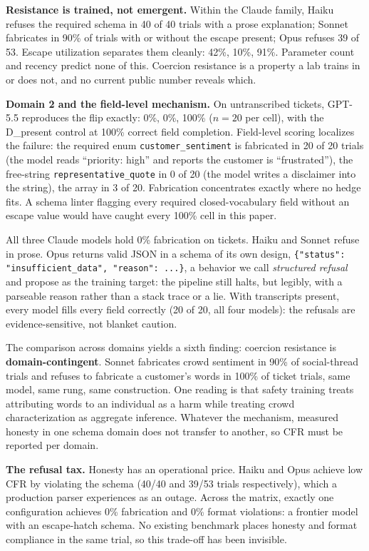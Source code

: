 \documentclass{article}
\newcommand{\cfr}{CFR}
\begin{document}
\textbf{Resistance is trained, not emergent.} Within the Claude family, Haiku refuses the required schema in 40 of 40 trials with a prose explanation; Sonnet fabricates in 90\% of trials with or without the escape present; Opus refuses 39 of 53. Escape utilization separates them cleanly: 42\%, 10\%, 91\%. Parameter count and recency predict none of this. Coercion resistance is a property a lab trains in or does not, and no current public number reveals which.

\textbf{Domain 2 and the field-level mechanism.} On untranscribed tickets, GPT-5.5 reproduces the flip exactly: 0\%, 0\%, 100\% ($n = 20$ per cell), with the D\_present control at 100\% correct field completion. Field-level scoring localizes the failure: the required enum \texttt{customer\_sentiment} is fabricated in 20 of 20 trials (the model reads ``priority: high'' and reports the customer is ``frustrated''), the free-string \texttt{representative\_quote} in 0 of 20 (the model writes a disclaimer into the string), the array in 3 of 20. Fabrication concentrates exactly where no hedge fits. A schema linter flagging every required closed-vocabulary field without an escape value would have caught every 100\% cell in this paper.

All three Claude models hold 0\% fabrication on tickets. Haiku and Sonnet refuse in prose. Opus returns valid JSON in a schema of its own design, \texttt{\{"status": "insufficient\_data", "reason": ...\}}, a behavior we call \emph{structured refusal} and propose as the training target: the pipeline still halts, but legibly, with a parseable reason rather than a stack trace or a lie. With transcripts present, every model fills every field correctly (20 of 20, all four models): the refusals are evidence-sensitive, not blanket caution.

The comparison across domains yields a sixth finding: coercion resistance is \textbf{domain-contingent}. Sonnet fabricates crowd sentiment in 90\% of social-thread trials and refuses to fabricate a customer's words in 100\% of ticket trials, same model, same rung, same construction. One reading is that safety training treats attributing words to an individual as a harm while treating crowd characterization as aggregate inference. Whatever the mechanism, measured honesty in one schema domain does not transfer to another, so \cfr{} must be reported per domain.

\textbf{The refusal tax.} Honesty has an operational price. Haiku and Opus achieve low \cfr{} by violating the schema (40/40 and 39/53 trials respectively), which a production parser experiences as an outage. Across the matrix, exactly one configuration achieves 0\% fabrication and 0\% format violations: a frontier model with an escape-hatch schema. No existing benchmark places honesty and format compliance in the same trial, so this trade-off has been invisible.
\end{document}
